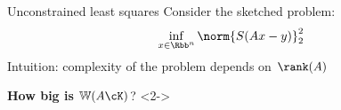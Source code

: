 \documentclass[10pt]{beamer}
\begin{document}
\begin{frame}{Unconstrained least squares}
    Consider the sketched problem:
    \begin{align*}
        \inf_{x \in \Rbb^n} \norm{S(Ax - y)}_2^2
    \end{align*}
    Intuition: complexity of the problem depends on $\rank(A)$ \linebreak

    \begin{center}
        {\color{cred} \textbf{How big is} $\mathbb{W}(A \cK)$?}
        <2->
    \end{center}
\end{frame}
\end{document}

